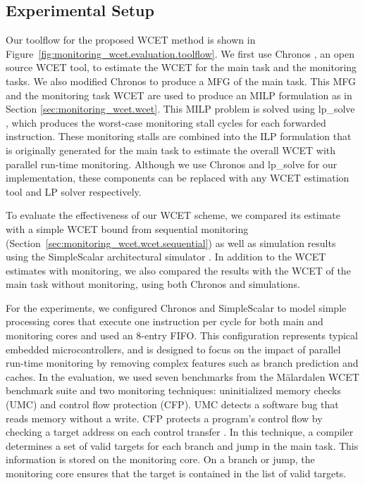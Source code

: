 \subsection{Experimental Setup}

Our toolflow for the proposed WCET method is shown in
Figure~\ref{fig:monitoring_wcet.evaluation.toolflow}. We first use Chronos
\cite{chronos-tool}, an open source WCET tool, to estimate the WCET for the
main task and the monitoring tasks. We also modified Chronos to produce a MFG
of the main task. This MFG and the monitoring task WCET are used to produce an
MILP formulation as in Section \ref{sec:monitoring_wcet.wcet}. This MILP
problem is solved using lp\_solve \cite{lpsolve}, which produces the worst-case
monitoring stall cycles for each forwarded instruction. These monitoring stalls
are combined into the ILP formulation that is originally generated for the main
task to estimate the overall WCET with parallel run-time monitoring. Although
we use Chronos and lp\_solve for our implementation, these components can be
replaced with any WCET estimation tool and LP solver respectively.

To evaluate the effectiveness of our WCET scheme, we compared its estimate with
a simple WCET bound from sequential monitoring
(Section~\ref{sec:monitoring_wcet.wcet.sequential}) as well as simulation
results using the SimpleScalar architectural simulator \cite{simplescalar}.  In
addition to the WCET estimates with monitoring, we also compared the results
with the WCET of the main task without monitoring, using both Chronos and
simulations. 

For the experiments, we configured Chronos and SimpleScalar to model simple
processing cores that execute one instruction per cycle for both main and
monitoring cores and used an 8-entry FIFO.  This configuration represents
typical embedded microcontrollers, and is designed to focus on the impact of
parallel run-time monitoring by removing complex features such as branch
prediction and caches.  In the evaluation, we used seven benchmarks from the
M\"alardalen WCET benchmark suite \cite{malardalen} and two monitoring
techniques: uninitialized memory checks (UMC) and control flow protection
(CFP).  UMC detects a software bug that reads memory without a write.  CFP
protects a program's control flow by checking a target address on each control
transfer \cite{arora-runtime05}. In this technique, a compiler determines a set
of valid targets for each branch and jump in the main task.  This information
is stored on the monitoring core.  On a branch or jump, the monitoring core
ensures that the target is contained in the list of valid targets.

